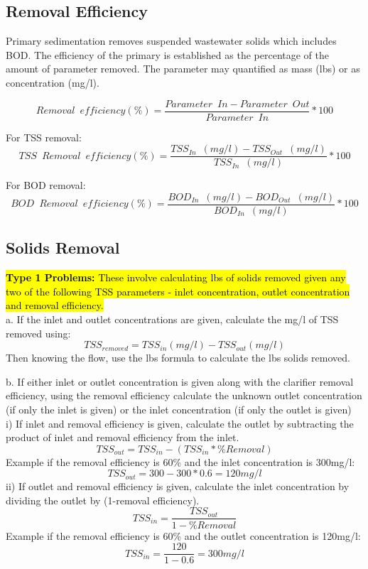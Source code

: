 \subsection{Removal Efficiency}		
Primary sedimentation removes suspended wastewater solids which includes BOD.  The efficiency of the primary is established as the percentage of the amount of parameter removed.  The parameter may quantified as mass (lbs) or as concentration (mg/l).

$$Removal \enspace efficiency (\%) = \dfrac{Parameter  \enspace In - Parameter  \enspace Out}{Parameter \enspace In} * 100$$

For TSS removal:\\
$$TSS \enspace Removal \enspace efficiency (\%) = \dfrac{TSS  _{In} \enspace(mg/l)  - TSS_{Out} \enspace(mg/l)  }{TSS _{In} \enspace(mg/l)  } * 100$$

For BOD removal:\\
$$BOD \enspace Removal \enspace efficiency (\%) = \dfrac{BOD_{In} \enspace(mg/l)  - BOD_{Out} \enspace(mg/l)  }{BOD _{In} \enspace(mg/l)  } * 100$$
\subsection{Solids Removal}	

\hl{\textbf{Type 1 Problems:}  These involve calculating lbs of solids removed given any two of the following TSS parameters - inlet concentration, outlet concentration and removal efficiency.}\\
a. If the inlet and outlet concentrations are given, calculate the mg/l of TSS removed using: 
$$TSS_{removed} = TSS_{in}(mg/l) - TSS_{out} (mg/l) $$
Then knowing the flow, use the lbs formula to calculate the lbs solids removed.

b. If either inlet or outlet concentration is given along with the clarifier removal efficiency, using the removal efficiency calculate the unknown outlet concentration (if only the inlet is given) or the inlet concentration (if only the outlet is given)\\
i) If inlet and removal efficiency is given, calculate the outlet by subtracting the product of inlet and removal efficiency from the inlet.
$$TSS_{out}=TSS_{in} - (TSS_{in}*\%Removal)$$
Example if the removal efficiency is 60\% and the inlet concentration is 300mg/l: $$TSS_{out}=300 - 300*0.6=120mg/l$$
ii) If outlet and removal efficiency is given, calculate the inlet concentration by dividing the outlet by (1-removal efficiency).\\
$$TSS_{in}=\dfrac{TSS_{out}}{1-\%Removal}$$
Example if the removal efficiency is 60\% and the outlet concentration is 120mg/l: $$TSS_{in}=\dfrac{120}{1-0.6}=300mg/l$$ 

